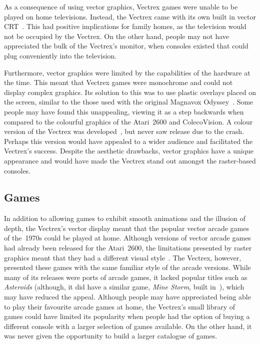 \documentclass{scrartcl}
\begin{document}
As a consequence of using vector graphics, Vectrex games were unable to be played on home televisions. Instead, the Vectrex came with its own built in vector CRT~\cite{vectrex:manual}. This had positive implications for family homes, as the television would not be occupied by the Vectrex. On the other hand, people may not have appreciated the bulk of the Vectrex's monitor, when consoles existed that could plug conveniently into the television.

Furthermore, vector graphics were limited by the capabilities of the hardware at the time. This meant that Vectrex games were monochrome and could not display complex graphics. Its solution to this was to use plastic overlays placed on the screen, similar to the those used with the original Magnavox Odyssey~\cite[p. 70]{wolf:pong}. Some people may have found this unappealing, viewing it as a step backwards when compared to the colourful graphics of the Atari~2600 and ColecoVision. A colour version of the Vectrex was developed~\cite{defanti:impact}, but never saw release due to the crash. Perhaps this version would have appealed to a wider audience and facilitated the Vectrex's success. Despite the aesthetic drawbacks, vector graphics have a unique appearance and would have made the Vectrex stand out amongst the raster-based consoles. 


\subsection*{Games}
In addition to allowing games to exhibit smooth animations and the illusion of depth, the Vectrex's vector display meant that the popular vector arcade games of the~1970s could be played at home. Although versions of vector arcade games had already been released for the Atari~2600, the limitations presented by raster graphics meant that they had a different visual style~\cite{montfort:random}. The Vectrex, however, presented these games with the same familiar style of the arcade versions. While many of its releases were ports of arcade games, it lacked popular titles such as \textit{Asteroids} (although, it did have a similar game, \textit{Mine Storm}, built in~\cite[p. 289]{baer:supercade}), which may have reduced the appeal. Although people may have appreciated being able to play their favourite arcade games at home, the Vectrex's small library of games could have limited its popularity when people had the option of buying a different console with a larger selection of games available. On the other hand, it was never given the opportunity to build a larger catalogue of games. 
\end{document}
